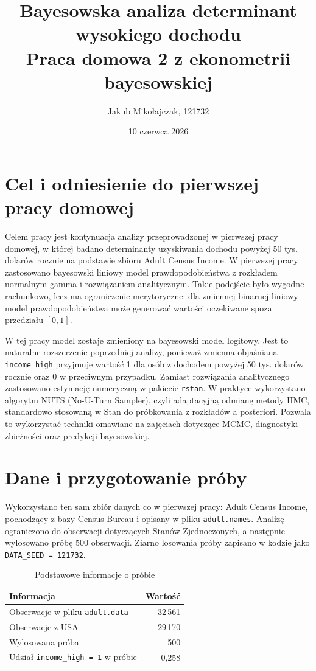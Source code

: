 \documentclass[12pt,a4paper]{article}
\title{Bayesowska analiza determinant wysokiego dochodu\\
\large Praca domowa 2 z ekonometrii bayesowskiej}
\author{Jakub Mikołajczak, 121732}
\date{10 czerwca 2026}
\begin{document}
\maketitle

\section{Cel i odniesienie do pierwszej pracy domowej}

Celem pracy jest kontynuacja analizy przeprowadzonej w pierwszej pracy domowej,
w której badano determinanty uzyskiwania dochodu powyżej 50 tys. dolarów rocznie
na podstawie zbioru Adult Census Income. W pierwszej pracy zastosowano
bayesowski liniowy model prawdopodobieństwa z rozkładem normalnym-gamma i
rozwiązaniem analitycznym. Takie podejście było wygodne rachunkowo, lecz ma
ograniczenie merytoryczne: dla zmiennej binarnej liniowy model
prawdopodobieństwa może generować wartości oczekiwane spoza przedziału
$[0,1]$.

W tej pracy model zostaje zmieniony na bayesowski model logitowy. Jest to
naturalne rozszerzenie poprzedniej analizy, ponieważ zmienna objaśniana
\texttt{income\_high} przyjmuje wartość 1 dla osób z dochodem powyżej 50 tys.
dolarów rocznie oraz 0 w przeciwnym przypadku. Zamiast rozwiązania
analitycznego zastosowano estymację numeryczną w pakiecie \texttt{rstan}. W
praktyce wykorzystano algorytm NUTS (No-U-Turn Sampler), czyli adaptacyjną
odmianę metody HMC, standardowo stosowaną w Stan do próbkowania z rozkładów a
posteriori. Pozwala to wykorzystać techniki omawiane na zajęciach dotyczące
MCMC, diagnostyki zbieżności oraz predykcji bayesowskiej.

\section{Dane i przygotowanie próby}

Wykorzystano ten sam zbiór danych co w pierwszej pracy: Adult Census Income,
pochodzący z bazy Census Bureau i opisany w pliku \texttt{adult.names}. Analizę
ograniczono do obserwacji dotyczących Stanów Zjednoczonych, a następnie
wylosowano próbę 500 obserwacji. Ziarno losowania próby zapisano w kodzie jako
\texttt{DATA\_SEED = 121732}.

\begin{table}[H]
\centering
\caption{Podstawowe informacje o próbie}
\small
\begin{tabular}{lr}
\toprule
Informacja & Wartość \\
\midrule
Obserwacje w pliku \texttt{adult.data} & 32\,561 \\
Obserwacje z USA & 29\,170 \\
Wylosowana próba & 500 \\
Udział \texttt{income\_high = 1} w próbie & 0{,}258 \\
\bottomrule
\end{tabular}
\end{table}
\end{document}
